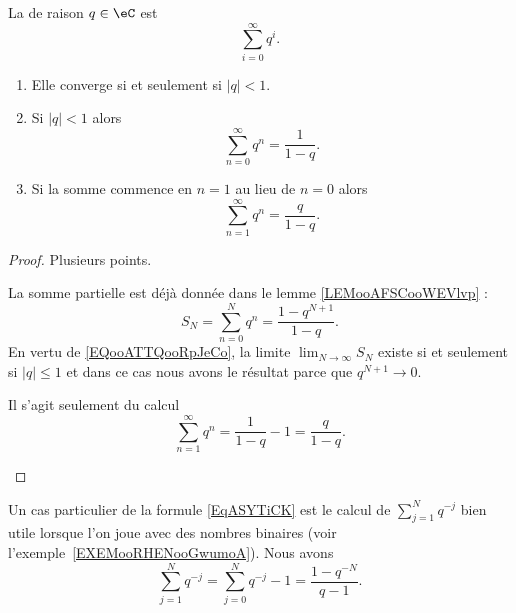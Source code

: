 \begin{propositionDef}      \label{PROPooWOWQooWbzukS}
	La  de raison \( q \in \eC\) est
	\begin{equation}    \label{EqZQTGooIWEFxL}
		\sum_{i=0}^\infty q^i.
	\end{equation}
	\begin{enumerate}
		\item       \label{ITEMooAFAMooGuXqBm}
		      Elle converge si et seulement si \( | q |<1\).
		\item       \label{ITEMooBJHBooBMEmiG}
		      Si \( | q |<1\) alors
		      \begin{equation}    \label{EqRGkBhrX}
			      \sum_{n=0}^{\infty}q^n=\frac{ 1 }{ 1-q }.
		      \end{equation}
		\item       \label{ITEMooVZHKooNGpDkx}
		      Si la somme commence en \( n=1\) au lieu de \( n=0\) alors
		      \begin{equation}        \label{EqPZOWooMdSRvY}
			      \sum_{n=1}^{\infty}q^n=\frac{ q }{ 1-q }.
		      \end{equation}
	\end{enumerate}
\end{propositionDef}

\begin{proof}
	Plusieurs points.
	\begin{subproof}
		La somme partielle est déjà donnée dans le lemme \ref{LEMooAFSCooWEVlvp} :
		\begin{equation}
			S_N=\sum_{n=0}^Nq^n=\frac{ 1-q^{N+1} }{ 1-q }.
		\end{equation}
		En vertu de \eqref{EQooATTQooRpJeCo}, la limite \( \lim_{N\to \infty} S_N\) existe si et seulement si \( | q |\leq 1\) et dans ce cas nous avons le résultat parce que \( q^{N+1}\to 0\).

		Il s'agit seulement du calcul
		\begin{equation}
			\sum_{n=1}^{\infty}q^n=\frac{1}{ 1-q }-1=\frac{ q }{ 1-q }.
		\end{equation}
	\end{subproof}
\end{proof}

Un cas particulier de la formule \eqref{EqASYTiCK} est le calcul de \( \sum_{j=1}^{N}q^{-j}\) bien utile lorsque l'on joue avec des nombres binaires (voir l'exemple~\ref{EXEMooRHENooGwumoA}). Nous avons
\begin{equation}        \label{EQooFMBAooEJkHWT}
	\sum_{j=1}^Nq^{-j}=\sum_{j=0}^Nq^{-j}-1=\frac{ 1-q^{-N} }{ q-1 }.
\end{equation}


